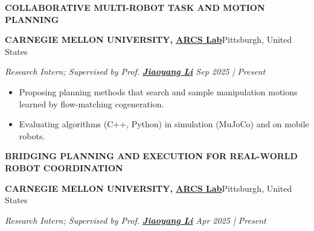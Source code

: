 \documentclass[a4paper,9pt]{extarticle}
\begin{document}
{\textbf{\fontsize{12pt}{4pt}\selectfont C}\textbf{\scshape OLLABORATIVE MULTI-ROBOT TASK AND MOTION PLANNING}}
\par\vspace{4pt}\noindent
\par\textbf{CARNEGIE MELLON UNIVERSITY, {\href{https://www.ri.cmu.edu/robotics-groups/arcs-lab/}{ARCS Lab}}}\hfill Pittsburgh, United States   %
\par\textit{Research Intern; Supervised by Prof. {\href{https://jiaoyangli.me/}{\textbf{Jiaoyang Li}}} \hfill Sep 2025 | Present}  %
\begin{itemize}
    \item Proposing planning methods that search and sample manipulation motions learned by flow-matching cogeneration. 
    \item Evaluating algorithms (C++, Python) in simulation (MuJoCo) and on mobile robots.
\end{itemize}
{\textbf{\fontsize{12pt}{4pt}\selectfont B}\textbf{\scshape RIDGING PLANNING AND EXECUTION FOR REAL-WORLD ROBOT COORDINATION}}
\par\vspace{4pt}\noindent
\par\textbf{CARNEGIE MELLON UNIVERSITY, {\href{https://www.ri.cmu.edu/robotics-groups/arcs-lab/}{ARCS Lab}}}\hfill Pittsburgh, United States   %
\par\textit{Research Intern; Supervised by Prof. {\href{https://jiaoyangli.me/}{\textbf{Jiaoyang Li}}} \hfill Apr 2025 | Present}  %
\end{document}
